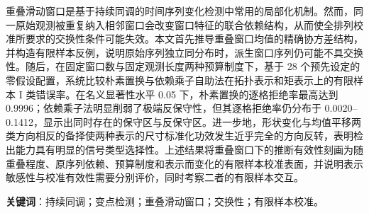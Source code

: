 重叠滑动窗口是基于持续同调的时间序列变化检测中常用的局部化机制。然而，同一原始观测被重复纳入相邻窗口会改变窗口特征的联合依赖结构，从而使全排列校准所要求的交换性条件可能失效。本文首先推导重叠窗口均值的精确协方差结构，并构造有限样本反例，说明原始序列独立同分布时，派生窗口序列仍可能不具交换性。随后，在固定窗口数与固定观测长度两种预算制度下，基于 28 个预先设定的零假设配置，系统比较朴素置换与依赖乘子自助法在拓扑表示和矩表示上的有限样本 I 类错误率。在名义显著性水平 0.05 下，朴素置换的逐格拒绝率最高达到 0.9996；依赖乘子法明显削弱了极端反保守性，但其逐格拒绝率仍分布于 0.0020--0.1412，显示出同时存在的保守区与反保守区。进一步地，形状变化与均值平移两类方向相反的备择使两种表示的尺寸标准化功效发生近乎完全的方向反转，表明检出能力具有明显的信号类型选择性。上述结果将重叠窗口下的推断有效性刻画为随重叠程度、原序列依赖、预算制度和表示而变化的有限样本校准表面，并说明表示敏感性与校准有效性需要分别评价，同时考察二者的有限样本交互。

\noindent\textbf{关键词}：持续同调；变点检测；重叠滑动窗口；交换性；有限样本校准。
